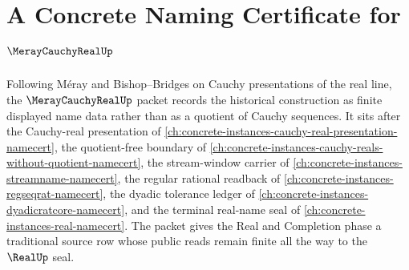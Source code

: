 \chapter{A Concrete Naming Certificate for $\MerayCauchyRealUp$}
\label{ch:concrete-instances-meray-cauchy-real-namecert}

Following Méray and Bishop--Bridges on Cauchy presentations of the real line, the $\MerayCauchyRealUp$ packet records the historical construction as finite displayed name data rather than as a quotient of Cauchy sequences. It sits after the Cauchy-real presentation of \autoref{ch:concrete-instances-cauchy-real-presentation-namecert}, the quotient-free boundary of \autoref{ch:concrete-instances-cauchy-reals-without-quotient-namecert}, the stream-window carrier of \autoref{ch:concrete-instances-streamname-namecert}, the regular rational readback of \autoref{ch:concrete-instances-regseqrat-namecert}, the dyadic tolerance ledger of \autoref{ch:concrete-instances-dyadicratcore-namecert}, and the terminal real-name seal of \autoref{ch:concrete-instances-real-namecert}. The packet gives the Real and Completion phase a traditional source row whose public reads remain finite all the way to the $\RealUp$ seal.


